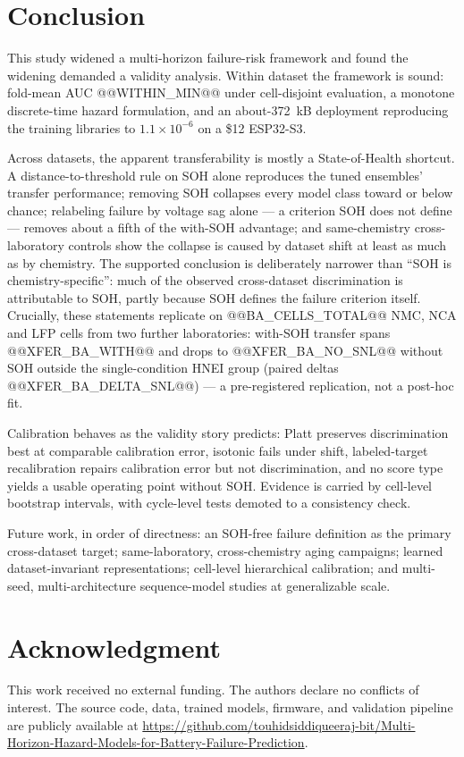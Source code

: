 \section{Conclusion}
This study widened a multi-horizon failure-risk framework and found the widening demanded a validity analysis. Within dataset the framework is sound: fold-mean AUC @@WITHIN_MIN@@ under cell-disjoint evaluation, a monotone discrete-time hazard formulation, and an about-372~kB deployment reproducing the training libraries to $1.1\times10^{-6}$ on a \$12 ESP32-S3.

Across datasets, the apparent transferability is mostly a State-of-Health shortcut. A distance-to-threshold rule on SOH alone reproduces the tuned ensembles' transfer performance; removing SOH collapses every model class toward or below chance; relabeling failure by voltage sag alone --- a criterion SOH does not define --- removes about a fifth of the with-SOH advantage; and same-chemistry cross-laboratory controls show the collapse is caused by dataset shift at least as much as by chemistry. The supported conclusion is deliberately narrower than ``SOH is chemistry-specific'': much of the observed cross-dataset discrimination is attributable to SOH, partly because SOH defines the failure criterion itself. Crucially, these statements replicate on @@BA_CELLS_TOTAL@@ NMC, NCA and LFP cells from two further laboratories: with-SOH transfer spans @@XFER_BA_WITH@@ and drops to @@XFER_BA_NO_SNL@@ without SOH outside the single-condition HNEI group (paired deltas @@XFER_BA_DELTA_SNL@@) --- a pre-registered replication, not a post-hoc fit.

Calibration behaves as the validity story predicts: Platt preserves discrimination best at comparable calibration error, isotonic fails under shift, labeled-target recalibration repairs calibration error but not discrimination, and no score type yields a usable operating point without SOH. Evidence is carried by cell-level bootstrap intervals, with cycle-level tests demoted to a consistency check.

Future work, in order of directness: an SOH-free failure definition as the primary cross-dataset target; same-laboratory, cross-chemistry aging campaigns; learned dataset-invariant representations; cell-level hierarchical calibration; and multi-seed, multi-architecture sequence-model studies at generalizable scale.

\clearpage
\section*{Acknowledgment}
This work received no external funding. The authors declare no conflicts of interest. The source code, data, trained models, firmware, and validation pipeline are publicly available at \url{https://github.com/touhidsiddiqueeraj-bit/Multi-Horizon-Hazard-Models-for-Battery-Failure-Prediction}.

